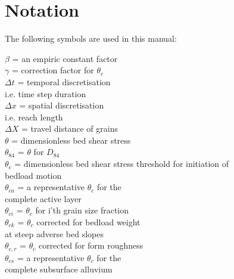 \documentclass[11pt,a4paper]{article}
\begin{document}
\section{Notation}\label{Notation}
The following symbols are used in this manual:\\
\begin{multicols}{2}
\noindent$\beta$ = an empiric constant factor \vspace{1.5ex} \\
$\gamma$ = correction factor for $\theta_{c}$ \vspace{1.5ex} \\
$\Delta{}t$ = temporal discretisation\\i.e. time step duration \vspace{1.5ex} \\
$\Delta{}x$ = spatial discretisation\\i.e. reach length \vspace{1.5ex} \\
$\Delta{}X$ = travel distance of grains \vspace{1.5ex} \\
$\theta$ = dimensionless bed shear stress \vspace{1.5ex} \\
$\theta_{84}$ = $\theta$ for $D_{84}$ \vspace{1.5ex} \\
$\theta_c$ = dimensionless bed shear stress threshold for initiation of\\bedload motion \vspace{1.5ex} \\
$\theta_{ca}$ = a representative $\theta_{c}$ for the\\complete active layer \vspace{1.5ex} \\
$\theta_{ci}$ = $\theta_c$ for i'th grain size fraction \vspace{1.5ex} \\
$\theta_{ck}$ = $\theta_c$ corrected for bedload weight\\at steep adverse bed slopes \vspace{1.5ex} \\
$\theta_{c,r}$ = $\theta_{c}$ corrected for form roughness \vspace{1.5ex} \\
$\theta_{cs}$ = a representative $\theta_{c}$ for the\\complete subsurface alluvium \vspace{1.5ex} \\

\end{multicols}
\end{document}
